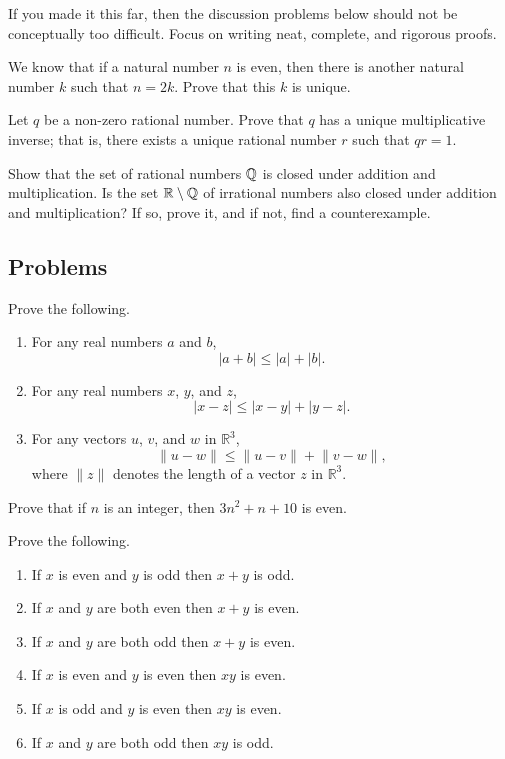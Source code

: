 \documentclass[../notes.tex]{subfiles}
\begin{document}
If you made it this far, then the discussion problems below should not be conceptually too difficult. Focus on writing neat, complete, and rigorous proofs.
\begin{exercise}
    We know that if a natural number $n$ is even, then there is another natural number $k$ such that $n = 2k$. Prove that this $k$ is unique.
\end{exercise}
\begin{exercise}
    Let $q$ be a non-zero rational number. Prove that $q$ has a unique multiplicative inverse; that is, there exists a unique rational number $r$ such that $qr = 1$.
\end{exercise}
\begin{exercise}
    Show that the set of rational numbers $\mathbb Q$ is closed under addition and multiplication. Is the set $\mathbb R \setminus \mathbb Q$ of irrational numbers also closed under addition and multiplication? If so, prove it, and if not, find a counterexample.
\end{exercise}

\subsection{Problems}
\begin{homework}
    Prove the following.
    \begin{enumerate}[label=(\alph*)]
        \item For any real numbers $a$ and $b$,
        \[|a+b|\le|a|+|b|.\]
        \item For any real numbers $x$, $y$, and $z$,
        \[|x-z|\le|x-y|+|y-z|.\]
        \item For any vectors $u$, $v$, and $w$ in $\mathbb R^3$,
        \[\lVert u-w\rVert\le\lVert u-v\rVert+\lVert v-w\rVert,\]
        where $\lVert z\rVert$ denotes the length of a vector $z$ in $\mathbb R^3$.
    \end{enumerate}
\end{homework}

\begin{homework}
    Prove that if $n$ is an integer, then $3n^2 + n + 10$ is even.
\end{homework}

\begin{homework}
    Prove the following.
    \begin{enumerate}[label=(\alph*)]
        \item If $x$ is even and $y$ is odd then $x + y$ is odd.
        \item If $x$ and $y$ are both even then $x + y$ is even.
        \item If $x$ and $y$ are both odd then $x + y$ is even.
        \item If $x$ is even and $y$ is even then $xy$ is even.
        \item If $x$ is odd and $y$ is even then $xy$ is even.
        \item If $x$ and $y$ are both odd then $xy$ is odd.
    \end{enumerate}
\end{homework}
\end{document}
